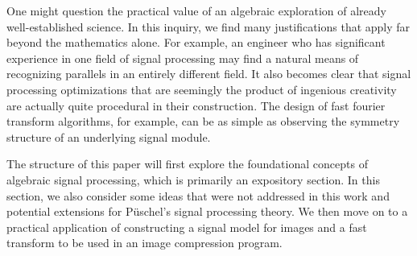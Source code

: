 \documentclass[12pt,technote]{IEEEtran}
\begin{document}
One might question the practical value of an algebraic exploration of already well-established science. In this inquiry, we find many justifications that apply far beyond the mathematics alone. For example, an engineer who has significant experience in one field of signal processing may find a natural means of recognizing parallels in an entirely different field. It also becomes clear that signal processing optimizations that are seemingly the product of ingenious creativity are actually quite procedural in their construction. The design of fast fourier transform algorithms, for example, can be as simple as observing the symmetry structure of an underlying signal module.

The structure of this paper will first explore the foundational concepts of algebraic signal processing, which is primarily an expository section. In this section, we also consider some ideas that were not addressed in this work and potential extensions for P\"uschel's signal processing theory. We then move on to a practical application of constructing a signal model for images and a fast transform to be used in an image compression program.
\end{document}
